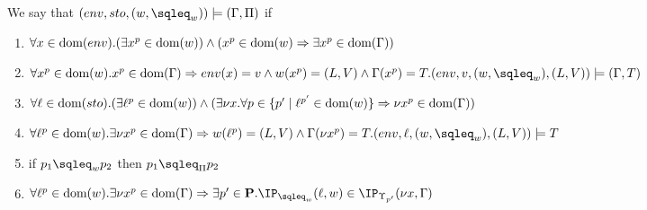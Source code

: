 \documentclass{eptcs}
\begin{document}

\begin{definition}\label{def:EnvAgree}
	We say that $(env,sto,(w,\sqleq_w))\models(\Gamma,\Pi)$ if 
	\begin{enumerate}
		\item \label{prop:1} $\forall x\in \textrm{dom}(env).(\exists x^p\in \textrm{dom}(w))\wedge(x^p\in \textrm{dom}(w)\Rightarrow \exists x^p\in \textrm{dom}(\Gamma))$
		\item \label{prop:2} $\forall x^p\in \dom(w).x^p\in \dom(\Gamma)\Rightarrow env(x)=v\wedge w(x^p)=(L,V)\wedge\Gamma(x^p)=T.\\(env,v,(w,\sqleq_w),(L,V))\models (\Gamma,T)$
		\item \label{prop:3} $\forall \ell\in \textrm{dom}(sto).(\exists \ell^p\in \textrm{dom}(w))\wedge(\exists \nu x.\forall p\in\{p'\mid\ell^{p'}\in \textrm{dom}(w)\}\Rightarrow\\\nu x^p\in \textrm{dom}(\Gamma))$
		\item \label{prop:4} $\forall \loc^p \in \dom(w).\exists\nu x^{p}\in \dom(\Gamma)\Rightarrow w(\loc^p)=(L,V)\wedge\Gamma(\nu x^{p})=\\T.(env,\loc,(w,\sqleq_w),(L,V))\models T$
		\item \label{prop:5} if $p_1\sqleq_w p_2$ then $p_1\sqleq_\Pi p_2$
	\item \label{prop:6} $\forall \loc^p\in \dom(w).\exists \nu
          x^p\in \dom(\Gamma)\Rightarrow\exists
          p'\in\cat{P}.\IP_{\sqleq_w}(\loc,w)\in
          \IP_{\Upsilon_{p'}}(\nu x,\Gamma)$ 
	\end{enumerate}
\end{definition}

\end{document}
